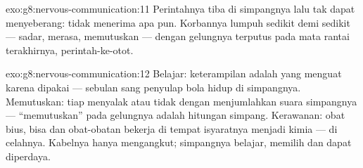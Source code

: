 \begin{solution}{exo:g8:nervous-communication:11}
Perintahnya tiba di simpangnya lalu tak dapat menyeberang:
 tidak menerima apa pun. Korbannya lumpuh sedikit
demi sedikit --- sadar, merasa, memutuskan --- dengan
gelungnya terputus pada mata rantai terakhirnya,
perintah-ke-otot.
\end{solution}

\begin{solution}{exo:g8:nervous-communication:12}
Belajar: keterampilan adalah  yang menguat karena
dipakai --- sebulan sang penyulap bola hidup di simpangnya.
Memutuskan: tiap  menyalak atau tidak dengan
menjumlahkan suara simpangnya --- ``memutuskan'' pada
gelungnya adalah hitungan simpang. Kerawanan: obat bius,
bisa dan obat-obatan bekerja di tempat isyaratnya menjadi
kimia --- di celahnya. Kabelnya hanya mengangkut; simpangnya
belajar, memilih dan dapat diperdaya.
\end{solution}


